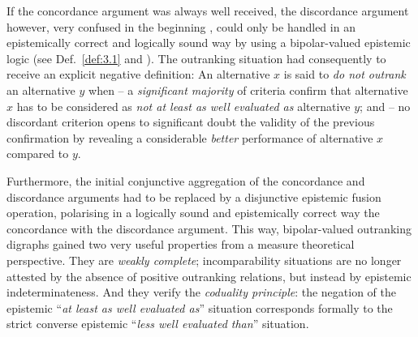 If the concordance argument was always well received, the discordance argument however, very confused in the beginning \citep{ROY-1966}, could only be handled in an epistemically correct and logically sound way by using a bipolar-valued epistemic logic (see Def.~\vref{def:3.1} and \citealp{BIS-2013}). The outranking situation had consequently to receive an explicit negative definition: An alternative $x$ is said to \emph{do not outrank} an alternative $y$ when – a \emph{significant majority} of criteria confirm that alternative $x$ has to be considered as \emph{not at least as well evaluated as} alternative $y$; and – no discordant criterion opens to significant doubt the validity of the previous confirmation by revealing a considerable \emph{better} performance of alternative $x$ compared to $y$.

Furthermore, the initial conjunctive aggregation of the concordance and discordance arguments had to be replaced by a disjunctive epistemic fusion operation, polarising in a logically sound and epistemically correct way the concordance with the discordance argument. This way, bipolar-valued outranking  digraphs gained two very useful properties from a measure theoretical perspective. They are \emph{weakly complete}; incomparability situations are no longer attested by the absence of positive outranking relations, but instead by epistemic indeterminateness. And they verify the \emph{coduality principle}: the negation of the epistemic ``\emph{at least as well evaluated as}'' situation corresponds formally to the strict converse epistemic ``\emph{less well evaluated than}'' situation.


%


